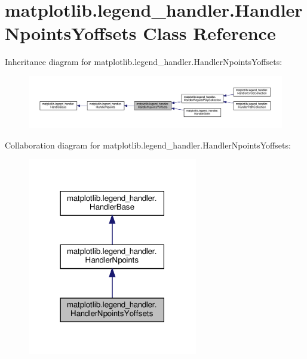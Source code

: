\hypertarget{classmatplotlib_1_1legend__handler_1_1HandlerNpointsYoffsets}{}\section{matplotlib.\+legend\+\_\+handler.\+Handler\+Npoints\+Yoffsets Class Reference}
\label{classmatplotlib_1_1legend__handler_1_1HandlerNpointsYoffsets}


Inheritance diagram for matplotlib.\+legend\+\_\+handler.\+Handler\+Npoints\+Yoffsets\+:
\nopagebreak
\begin{figure}[H]
\begin{center}
\leavevmode
\includegraphics[width=350pt]{classmatplotlib_1_1legend__handler_1_1HandlerNpointsYoffsets__inherit__graph}
\end{center}
\end{figure}


Collaboration diagram for matplotlib.\+legend\+\_\+handler.\+Handler\+Npoints\+Yoffsets\+:
\nopagebreak
\begin{figure}[H]
\begin{center}
\leavevmode
\includegraphics[width=210pt]{classmatplotlib_1_1legend__handler_1_1HandlerNpointsYoffsets__coll__graph}
\end{center}
\end{figure}
